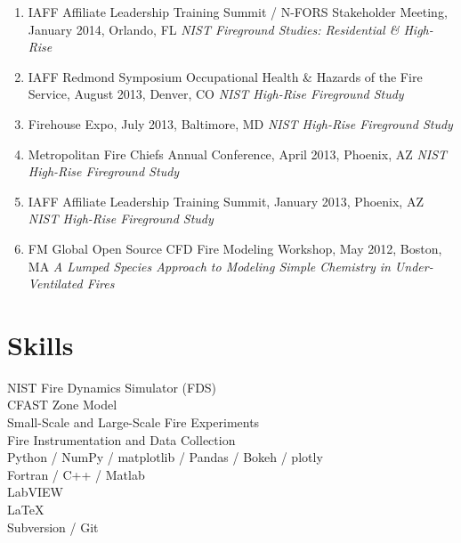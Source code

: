 \documentclass[10pt,letterpaper]{article}
\begin{document}
\begin{enumerate}
\item IAFF Affiliate Leadership Training Summit / N-FORS Stakeholder Meeting, January 2014, Orlando, FL {\em NIST Fireground Studies: Residential \& High-Rise}
\item IAFF Redmond Symposium Occupational Health \& Hazards of the Fire Service, August 2013, Denver, CO {\em NIST High-Rise Fireground Study}
\item Firehouse Expo, July 2013, Baltimore, MD {\em NIST High-Rise Fireground Study}
\item Metropolitan Fire Chiefs Annual Conference, April 2013, Phoenix, AZ {\em NIST High-Rise Fireground Study}
\item IAFF Affiliate Leadership Training Summit, January 2013, Phoenix, AZ {\em NIST High-Rise Fireground Study}
\item FM Global Open Source CFD Fire Modeling Workshop, May 2012, Boston, MA {\em A Lumped Species Approach to Modeling Simple Chemistry in Under-Ventilated Fires}
\end{enumerate}

\clearpage



\section*{Skills}
NIST Fire Dynamics Simulator (FDS) \\
CFAST Zone Model \\
Small-Scale and Large-Scale Fire Experiments \\
Fire Instrumentation and Data Collection \\
Python / NumPy / matplotlib / Pandas / Bokeh / plotly \\
Fortran / C++ / Matlab \\
LabVIEW \\
\LaTeX \\
Subversion / Git \\
\end{document}
